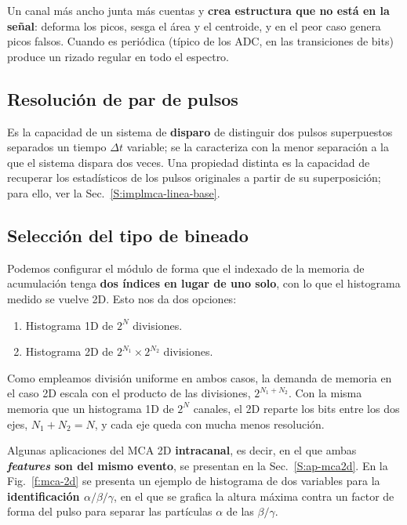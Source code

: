 Un canal más ancho junta más cuentas y \textbf{crea estructura que no está en la
señal}: deforma los picos, sesga el área y el centroide, y en el peor caso
genera picos falsos. Cuando es periódica (típico de los ADC, en las transiciones
de bits) produce un rizado regular en todo el espectro.

\subsection{Resolución de par de pulsos}
\label{S:mca-par-pulsos}

Es la capacidad de un sistema de \textbf{disparo} de distinguir dos pulsos
superpuestos separados un tiempo $\Delta t$ variable; se la caracteriza con la
menor separación a la que el sistema dispara dos veces. Una propiedad distinta
es la capacidad de recuperar los estadísticos de los pulsos originales a partir
de su superposición; para ello, ver la
Sec.~\ref{S:implmca-linea-base}.

\subsection{Selección del tipo de bineado}
\label{S:mca-bineado}

Podemos configurar el módulo de forma que el indexado de la memoria de
acumulación tenga \textbf{dos índices en lugar de uno solo}, con lo que el
histograma medido se vuelve 2D. Esto nos da dos opciones:
\begin{enumerate}
  \item Histograma 1D de $2^N$ divisiones.
  \item Histograma 2D de $2^{N_1} \times 2^{N_2}$ divisiones.
\end{enumerate}

Como empleamos división uniforme en ambos casos, la demanda de memoria en el
caso 2D escala con el producto de las divisiones, $2^{N_1+N_2}$. Con la misma
memoria que un histograma 1D de $2^N$ canales, el 2D reparte los bits entre los
dos ejes, $N_1 + N_2 = N$, y cada eje queda con mucha menos resolución.

Algunas aplicaciones del MCA 2D \textbf{intracanal}, es decir, en el que ambas
\textbf{\emph{features} son del mismo evento}, se presentan en la
Sec.~\ref{S:ap-mca2d}. En la Fig.~\ref{f:mca-2d} se presenta un ejemplo de
histograma de dos variables para la \textbf{identificación
$\alpha/\beta/\gamma$}, en el que se grafica la altura máxima contra un factor
de forma del pulso para separar las partículas $\alpha$ de las $\beta/\gamma$.

